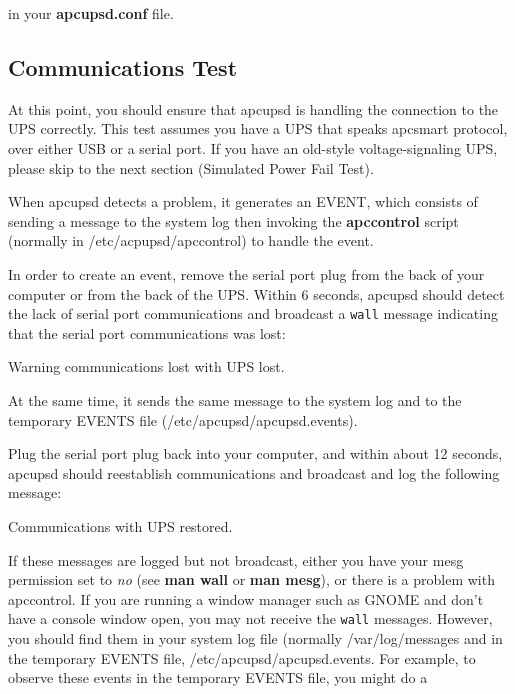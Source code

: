 in your {\bf apcupsd.conf} file. 

\label{Communications-Test}

\subsection*{Communications Test}

\label{index-Testing_002c-Communications-91}
\label{index-Communications-Testing-92}
At this point, you should ensure that apcupsd is handling the connection to
the UPS correctly. This test assumes you have a UPS that speaks apcsmart
protocol, over either USB or a serial port.  If you have an old-style
voltage-signaling UPS, please skip to the next section (Simulated Power Fail
Test).  

When apcupsd detects a problem, it generates an EVENT, which consists of
sending a message to the system log then invoking the {\bf apccontrol} script
(normally in /etc/acpupsd/apccontrol) to handle the event.  

In order to create an event, remove the serial port plug from the back of your
computer or from the back of the UPS. Within 6 seconds, apcupsd should detect
the lack of serial port communications and broadcast a {\tt wall} message
indicating that the serial port communications was lost:  

Warning communications lost with UPS lost.  

At the same time, it sends the same message to the system log and to the
temporary EVENTS file (/etc/apcupsd/apcupsd.events).  

Plug the serial port plug back into your computer, and within about 12
seconds, apcupsd should reestablish communications and broadcast and log the
following message:  

Communications with UPS restored.  

If these messages are logged but not broadcast, either you have your mesg
permission set to {\it no} (see {\bf man wall} or {\bf man mesg}), or there is
a problem with apccontrol. If you are running a window manager such as GNOME
and don't have a console window open, you may not receive the {\tt wall}
messages. However, you should find them in your system log file (normally
/var/log/messages and in the temporary EVENTS file,
/etc/apcupsd/apcupsd.events. For example, to observe these events in the
temporary EVENTS file, you might do a 

